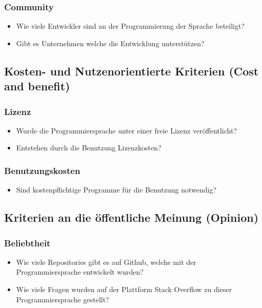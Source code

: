 \subsubsection{Community}
\begin{itemize}
	\item Wie viele Entwickler sind an der Programmierung der Sprache beteiligt?
	\item Gibt es Unternehmen welche die Entwicklung unterstützen?
\end{itemize}

\subsection{Kosten- und Nutzenorientierte Kriterien (Cost and benefit)}
\subsubsection{Lizenz}
\begin{itemize}
	\item Wurde die Programmiersprache unter einer freie Lizenz veröffentlicht?
	\item Entstehen durch die Benutzung Lizenzkosten?
\end{itemize}

\subsubsection{Benutzungskosten}
\begin{itemize}
	\item Sind kostenpflichtige Programme für die Benutzung notwendig?
\end{itemize}

\subsection{Kriterien an die öffentliche Meinung (Opinion)}
\subsubsection{Beliebtheit}
\begin{itemize}
	\item Wie viele Repositories gibt es auf Github, welche mit der Programmiersprache entwickelt wurden?
	\item Wie viele Fragen wurden auf der Plattform Stack Overflow zu dieser Programmiersprache gestellt?
\end{itemize}

